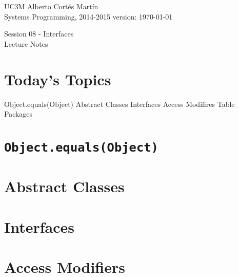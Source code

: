 \documentclass[a4paper, 9pt]{extarticle}
\newcommand{\realtitle}{Session 08 - Interfaces}
\begin{document}
\makebox[\linewidth]{\rule{\textwidth}{0.4pt}}
UC3M \hfill Alberto Cortés Martín\\
Systems Programming, 2014-2015 \hfill version: \today\\
\makebox[\linewidth]{\rule{\textwidth}{0.4pt}}
\begin{center}
  \Large{\realtitle}\\Lecture Notes
\end{center}
\makebox[\linewidth]{\rule{\textwidth}{0.4pt}}
\vspace{1cm}


\section{Today's Topics}
\begin{blackboard}
Object.equals(Object)
Abstract Classes
Interfaces
Access Modifires Table
Packages
\end{blackboard}


\section{\texttt{Object.equals(Object)}}

\section{Abstract Classes}

\section{Interfaces}

\section{Access Modifiers}
\end{document}
